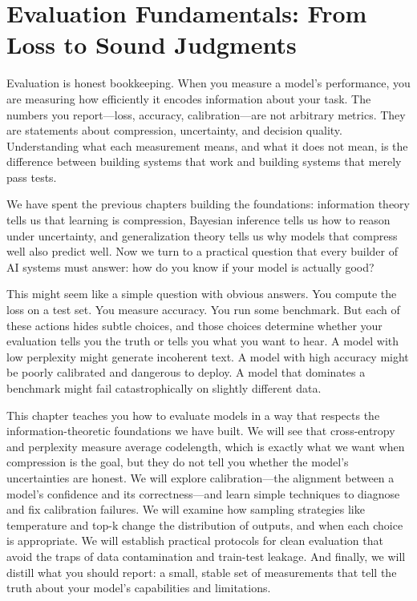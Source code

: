 \chapter{Evaluation Fundamentals: From Loss to Sound Judgments}
\label{ch:evaluation}

\begin{keyinsight}
Evaluation is honest bookkeeping. When you measure a model's performance, you are measuring how efficiently it encodes information about your task. The numbers you report---loss, accuracy, calibration---are not arbitrary metrics. They are statements about compression, uncertainty, and decision quality. Understanding what each measurement means, and what it does not mean, is the difference between building systems that work and building systems that merely pass tests.
\end{keyinsight}

\vspace{1.5em}

We have spent the previous chapters building the foundations: information theory tells us that learning is compression, Bayesian inference tells us how to reason under uncertainty, and generalization theory tells us why models that compress well also predict well. Now we turn to a practical question that every builder of AI systems must answer: how do you know if your model is actually good?

\vspace{0.3cm}

This might seem like a simple question with obvious answers. You compute the loss on a test set. You measure accuracy. You run some benchmark. But each of these actions hides subtle choices, and those choices determine whether your evaluation tells you the truth or tells you what you want to hear. A model with low perplexity might generate incoherent text. A model with high accuracy might be poorly calibrated and dangerous to deploy. A model that dominates a benchmark might fail catastrophically on slightly different data.

\vspace{0.3cm}

This chapter teaches you how to evaluate models in a way that respects the information-theoretic foundations we have built. We will see that cross-entropy and perplexity measure average codelength, which is exactly what we want when compression is the goal, but they do not tell you whether the model's uncertainties are honest. We will explore calibration---the alignment between a model's confidence and its correctness---and learn simple techniques to diagnose and fix calibration failures. We will examine how sampling strategies like temperature and top-k change the distribution of outputs, and when each choice is appropriate. We will establish practical protocols for clean evaluation that avoid the traps of data contamination and train-test leakage. And finally, we will distill what you should report: a small, stable set of measurements that tell the truth about your model's capabilities and limitations.

